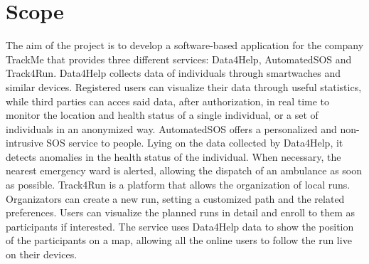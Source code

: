 \section{Scope}
The aim of the project is to develop a software-based application for the company TrackMe that
provides three different services: Data4Help, AutomatedSOS and Track4Run.
Data4Help collects data of individuals through smartwaches and similar devices. Registered users can
visualize their data through useful statistics, while third parties can acces said data, after authorization,
in real time to monitor the location and health status of a single individual, or a set of individuals in an
anonymized way.
AutomatedSOS offers a personalized and non-intrusive SOS service to  people. Lying on the
data collected by Data4Help, it detects anomalies in the health status of the individual. When
necessary, the nearest emergency ward is alerted, allowing the dispatch of an ambulance as soon as
possible.
Track4Run is a platform that allows the organization of local runs. Organizators can create a new run, setting a customized path and the related preferences. Users can visualize the planned runs in detail and enroll to them as participants if interested. The
service uses Data4Help data to show the position of the participants on a map, allowing all the online users to follow the run live on their devices.